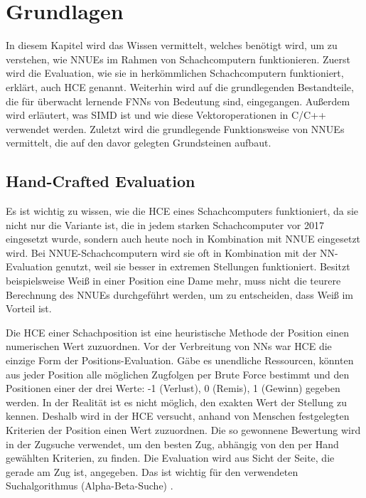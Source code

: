 \chapter{Grundlagen}

In diesem Kapitel wird das Wissen vermittelt, welches benötigt wird, um zu verstehen, wie \acp{NNUE} im Rahmen von Schachcomputern funktionieren. Zuerst wird die Evaluation, wie sie in herkömmlichen Schachcomputern funktioniert, erklärt, auch \ac{HCE} genannt. Weiterhin wird auf die grundlegenden Bestandteile, die für überwacht lernende \acp{FNN} von Bedeutung sind, eingegangen. Außerdem wird erläutert, was \ac{SIMD} ist und wie diese Vektoroperationen in C/C++ verwendet werden. Zuletzt wird die grundlegende Funktionsweise von \acp{NNUE} vermittelt, die auf den davor gelegten Grundsteinen aufbaut.

\section{Hand-Crafted Evaluation}
\label{chap:HCE}

Es ist wichtig zu wissen, wie die \ac{HCE} eines Schachcomputers funktioniert, da sie nicht nur die Variante ist, die in jedem starken Schachcomputer vor 2017 eingesetzt wurde, sondern auch heute noch in Kombination mit \ac{NNUE} eingesetzt wird. Bei \ac{NNUE}-Schachcomputern wird sie oft in Kombination mit der \ac{NN}-Evaluation genutzt, weil sie besser in extremen Stellungen funktioniert. Besitzt beispielsweise Weiß in einer Position eine Dame mehr, muss nicht die teurere Berechnung des \acp{NNUE} durchgeführt werden, um zu entscheiden, dass Weiß im Vorteil ist.

Die \ac{HCE} einer Schachposition ist eine heuristische Methode der Position einen numerischen Wert zuzuordnen. Vor der Verbreitung von \acp{NN} war \ac{HCE} die einzige Form der Positions-Evaluation. Gäbe es unendliche Ressourcen, könnten aus jeder Position alle möglichen Zugfolgen per Brute Force bestimmt und den Positionen einer der drei Werte: -1 (Verlust), 0 (Remis), 1 (Gewinn) gegeben werden. In der Realität ist es nicht möglich, den exakten Wert der Stellung zu kennen. Deshalb wird in der \ac{HCE} versucht, anhand von Menschen festgelegten Kriterien der Position einen Wert zuzuordnen. Die so gewonnene Bewertung wird in der Zugsuche verwendet, um den besten Zug, abhängig von den per Hand gewählten Kriterien, zu finden. Die Evaluation wird aus Sicht der Seite, die gerade am Zug ist, angegeben. Das ist wichtig für den verwendeten Suchalgorithmus (Alpha-Beta-Suche) \cite{Slagle1969}.

